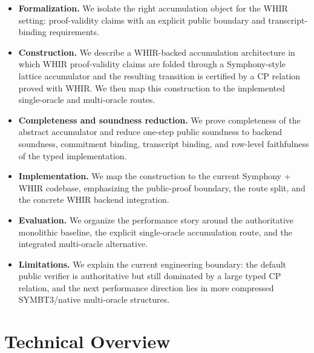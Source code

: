 \documentclass[11pt]{article}
\theoremstyle{definition}
\begin{document}
\begin{itemize}
  \item \textbf{Formalization.} We isolate the right accumulation object for the
  WHIR setting: proof-validity claims with an explicit public boundary and
  transcript-binding requirements.

  \item \textbf{Construction.} We describe a WHIR-backed accumulation
  architecture in which WHIR proof-validity claims are folded through a
  Symphony-style lattice accumulator and the resulting transition is certified by
  a CP relation proved with WHIR. We then map this construction to the
  implemented single-oracle and multi-oracle routes.

  \item \textbf{Completeness and soundness reduction.} We prove completeness
  of the abstract accumulator and reduce one-step public soundness to backend
  soundness, commitment binding, transcript binding, and row-level faithfulness
  of the typed implementation.

  \item \textbf{Implementation.} We map the construction to the current Symphony
  + WHIR codebase, emphasizing the public-proof boundary, the route split, and
  the concrete WHIR backend integration.

  \item \textbf{Evaluation.} We organize the performance story around the
  authoritative monolithic baseline, the explicit single-oracle accumulation
  route, and the integrated multi-oracle alternative.

  \item \textbf{Limitations.} We explain the current engineering boundary: the
  default public verifier is authoritative but still dominated by a large typed
  CP relation, and the next performance direction lies in more compressed
  SYMBT3/native multi-oracle structures.
\end{itemize}

\section{Technical Overview}
\label{sec:technical-overview}
\end{document}
